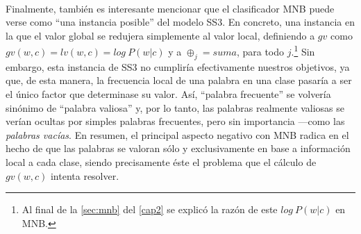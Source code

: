 \

Finalmente, también es interesante mencionar que el clasificador \acf{MNB} puede verse como ``una instancia posible'' del modelo SS3. En concreto, una instancia en la que el valor global se redujera simplemente al valor local, definiendo a $gv$ como $gv(w, c) = lv(w, c) = log\ P(w|c)$ y a $\oplus_j = suma$, para todo $j$.\footnote{Al final de la \autoref{sec:mnb} del \autoref{cap2} se explicó la razón de este $log\ P(w|c)$ en \ac{MNB}.}
Sin embargo, esta instancia de SS3 no cumpliría efectivamente nuestros objetivos, ya que,
de esta manera, la frecuencia local de una palabra en una clase pasaría a ser el único factor que determinase su valor. Así, ``palabra frecuente'' se volvería sinónimo de ``palabra valiosa'' y, por lo tanto, las palabras realmente valiosas se verían ocultas por simples palabras frecuentes, pero sin importancia ---como las \emph{palabras vacías}.
En resumen, el principal aspecto negativo con \ac{MNB} radica en el hecho de que las palabras se valoran sólo y exclusivamente en base a información local a cada clase, siendo precisamente éste el problema que el cálculo de $gv(w,c)$ intenta resolver.



